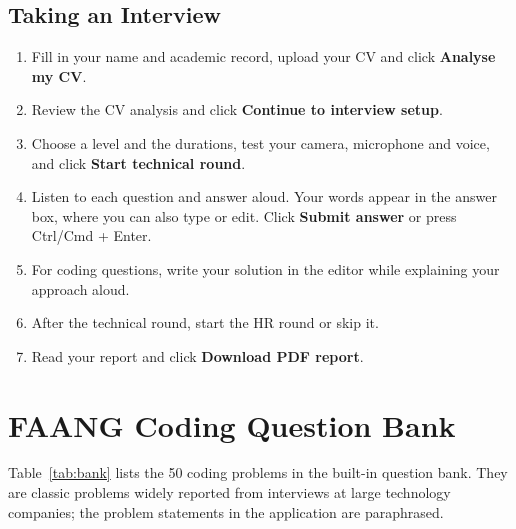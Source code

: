 \documentclass[12pt,a4paper,oneside]{report}
\begin{document}
\section{Taking an Interview}
\begin{enumerate}
  \item Fill in your name and academic record, upload your CV and click \textbf{Analyse my CV}.
  \item Review the CV analysis and click \textbf{Continue to interview setup}.
  \item Choose a level and the durations, test your camera, microphone and voice, and click \textbf{Start technical round}.
  \item Listen to each question and answer aloud. Your words appear in the answer box, where you can also type or edit. Click \textbf{Submit answer} or press Ctrl/Cmd + Enter.
  \item For coding questions, write your solution in the editor while explaining your approach aloud.
  \item After the technical round, start the HR round or skip it.
  \item Read your report and click \textbf{Download PDF report}.
\end{enumerate}

\chapter{FAANG Coding Question Bank}
Table~\ref{tab:bank} lists the 50 coding problems in the built-in question bank. They are classic problems widely reported from interviews at large technology companies; the problem statements in the application are paraphrased.
\end{document}
